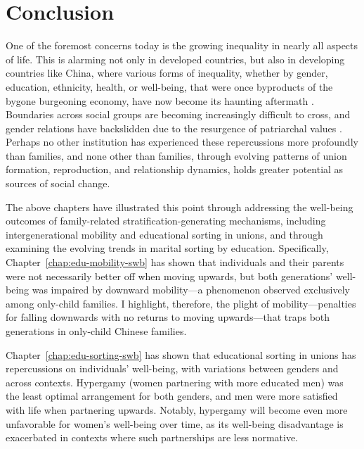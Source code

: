 \chapter{Conclusion}
\label{chap:conclusion}

One of the foremost concerns today is the growing inequality in nearly all aspects of life. This is alarming not only in developed countries, but also in developing countries like China, where various forms of inequality, whether by gender, education, ethnicity, health, or well-being, that were once byproducts of the bygone burgeoning economy, have now become its haunting aftermath \parencite{sicularUrbanRuralIncomeGap2007,xieIncomeInequalityTodays2014,yeungHigherEducationExpansion2013}. Boundaries across social groups are becoming increasingly difficult to cross, and gender relations have backslidden due to the resurgence of patriarchal values \parencite{jiUnequalCareUnequal2017}. Perhaps no other institution has experienced these repercussions more profoundly than families, and none other than families, through evolving patterns of union formation, reproduction, and relationship dynamics, holds greater potential as sources of social change.

The above chapters have illustrated this point through addressing the well-being outcomes of family-related stratification-generating mechanisms, including intergenerational mobility and educational sorting in unions, and through examining the evolving trends in marital sorting by education. Specifically, Chapter~\ref{chap:edu-mobility-swb} has shown that individuals and their parents were not necessarily better off when moving upwards, but both generations' well-being was impaired by downward mobility—a phenomenon observed exclusively among only-child families. I highlight, therefore, the plight of mobility—penalties for falling downwards with no returns to moving upwards—that traps both generations in only-child Chinese families.

Chapter~\ref{chap:edu-sorting-swb} has shown that educational sorting in unions has repercussions on individuals' well-being, with variations between genders and across contexts. Hypergamy (women partnering with more educated men) was the least optimal arrangement for both genders, and men were more satisfied with life when partnering upwards. Notably, hypergamy will become even more unfavorable for women's well-being over time, as its well-being disadvantage is exacerbated in contexts where such partnerships are less normative.

